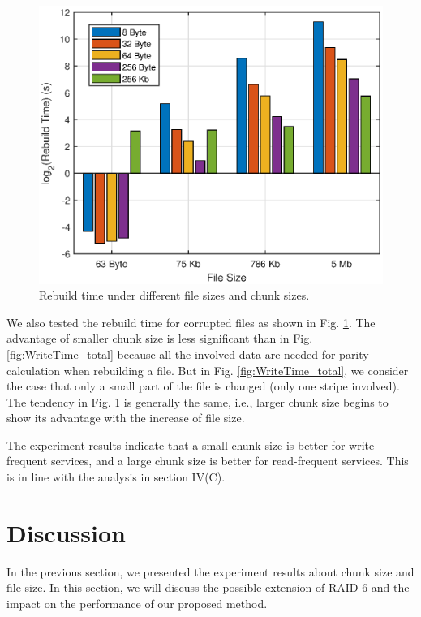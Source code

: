 \documentclass[journal]{IEEEtran}
\begin{document}
\begin{figure}[htbp]
  \centering
  \includegraphics[width=0.9\linewidth]{Images/RebuildTime.eps}
  \caption{Rebuild time under different file sizes and chunk sizes.}
  \label{fig:RebuildTime}
\end{figure}
We also tested the rebuild time for corrupted files as shown in Fig. \ref{fig:RebuildTime}. The advantage of smaller chunk size is less significant than in Fig. \ref{fig:WriteTime_total} because all the involved data are needed for parity calculation when rebuilding a file. But in Fig. \ref{fig:WriteTime_total}, we consider the case that only a small part of the file is changed (only one stripe involved). The tendency in Fig. \ref{fig:RebuildTime} is generally the same, i.e., larger chunk size begins to show its advantage with the increase of file size.

The experiment results indicate that a small chunk size is better for write-frequent services, and a large chunk size is better for read-frequent services. This is in line with the analysis in section IV(C).

\section{Discussion}
In the previous section, we presented the experiment results about chunk size and file size. In this section, we will discuss the possible extension of RAID-6 and the impact on the performance of our proposed method.
\end{document}
